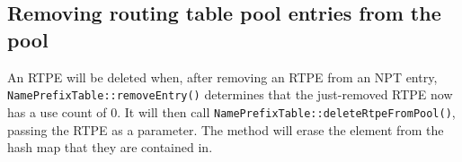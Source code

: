 \subsection{Removing routing table pool entries from the pool}
\label{sec:npt-rtpe-del}
An RTPE will be deleted when, after removing an RTPE from an NPT entry, \texttt{NamePrefixTable::removeEntry()} determines that the just-removed RTPE now has a use count of 0.
It will then call \texttt{NamePrefixTable::deleteRtpeFromPool()}, passing the RTPE as a parameter.
The method will erase the element from the hash map that they are contained in.
